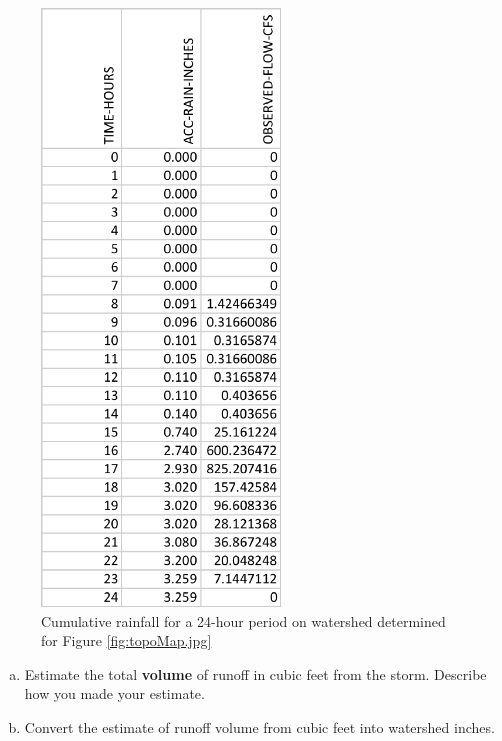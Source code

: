 \documentclass[12pt]{article}
\begin{document}
\begin{enumerate}
\begin{figure}[h!] %
   \centering
   \includegraphics[width=2.5in]{RARO-DATA.pdf} 
   \caption{Cumulative rainfall for a 24-hour period on watershed determined for Figure \ref{fig:topoMap.jpg}}
   \label{fig:RARO-DATA.pdf}
\end{figure}
\clearpage
\begin{enumerate}[a)]
\item  Estimate the total \textbf{volume} of runoff in cubic feet from the storm.  Describe how you made your estimate.
~\newline
~\newline
~\newline
~\newline
~\newline
~\newline
~\newline
~\newline
\item Convert the estimate of runoff volume from cubic feet into watershed inches.
~\newline
~\newline

\end{enumerate}
\end{enumerate}
\end{document}
